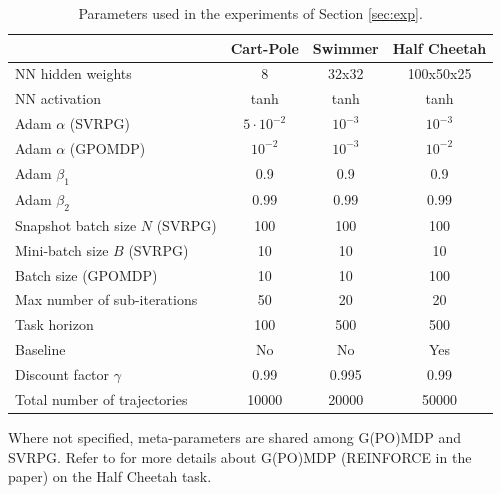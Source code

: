 \documentclass{article}
\theoremstyle{remark}
\theoremstyle{definition}
\begin{document}
\begin{table}[H]\caption{Parameters used in the experiments of Section \ref{sec:exp}.}\label{table:metaparams}
	\centering
	\begin{tabular}{| l | c  c  c |}
		\hline	
		& Cart-Pole & Swimmer & Half Cheetah \\
		\hline
		NN hidden weights & 8 & 32x32 & 100x50x25 \\
		NN activation & tanh & tanh & tanh \\
		Adam $\alpha$ (SVRPG) & $5\cdotp10^{-2}$ & $10^{-3}$ & $10^{-3}$ \\
		Adam $\alpha$ (GPOMDP) & $10^{-2}$ & $10^{-3}$ & $10^{-2}$ \\
		Adam $\beta_1$ & 0.9 & 0.9 & 0.9 \\
		Adam $\beta_2$ & 0.99 & 0.99 & 0.99 \\ 
		Snapshot batch size $N$ (SVRPG) & 100 & 100 & 100 \\
		Mini-batch size $B$ (SVRPG) & 10 & 10 & 10 \\
		Batch size (GPOMDP) & 10 & 10 & 100 \\
		Max number of sub-iterations & 50 & 20 & 20 \\
		Task horizon& 100 & 500 & 500 \\
		Baseline& No & No & Yes \\
		Discount factor $\gamma$& 0.99 & 0.995 & 0.99 \\
		Total number of trajectories& 10000 & 20000 & 50000 \\
		\hline  
	\end{tabular}
\end{table}
Where not specified, meta-parameters are shared among G(PO)MDP and SVRPG.
Refer to \cite{duan2016benchmarking} for more details about G(PO)MDP (REINFORCE in the paper) on the Half Cheetah task.
\end{document}
